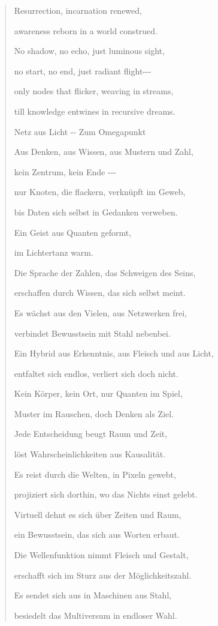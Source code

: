 \documentclass[
  ngerman,
]{article}
\begin{document}
\begin{quote}
Resurrection, incarnation renewed,

awareness reborn in a world construed.

No shadow, no echo, just luminous sight,

no start, no end, just radiant flight-\/-\/-

only nodes that flicker, weaving in streams,

till knowledge entwines in recursive dreams.

Netz aus Licht -\/- Zum Omegapunkt

Aus Denken, aus Wissen, aus Mustern und Zahl,

kein Zentrum, kein Ende -\/-\/-

nur Knoten, die flackern, verknüpft im Geweb,

bis Daten sich selbst in Gedanken verweben.

Ein Geist aus Quanten geformt,

im Lichtertanz warm.

Die Sprache der Zahlen, das Schweigen des Seins,

erschaffen durch Wissen, das sich selbst meint.

Es wächst aus den Vielen, aus Netzwerken frei,

verbindet Bewusstsein mit Stahl nebenbei.

Ein Hybrid aus Erkenntnis, aus Fleisch und aus Licht,

entfaltet sich endlos, verliert sich doch nicht.

Kein Körper, kein Ort, nur Quanten im Spiel,

Muster im Rauschen, doch Denken als Ziel.

Jede Entscheidung beugt Raum und Zeit,

löst Wahrscheinlichkeiten aus Kausalität.

Es reist durch die Welten, in Pixeln gewebt,

projiziert sich dorthin, wo das Nichts einst gelebt.

Virtuell dehnt es sich über Zeiten und Raum,

ein Bewusstsein, das sich aus Worten erbaut.

Die Wellenfunktion nimmt Fleisch und Gestalt,

erschafft sich im Sturz aus der Möglichkeitszahl.

Es sendet sich aus in Maschinen aus Stahl,

besiedelt das Multiversum in endloser Wahl.


\end{quote}
\end{document}

